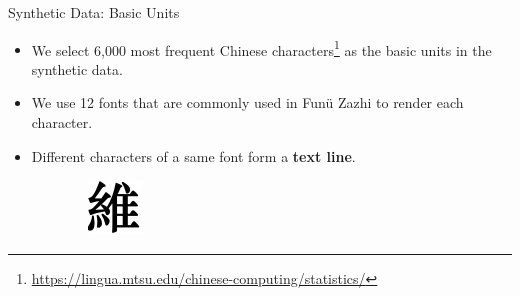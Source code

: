 \documentclass{beamer}
\begin{document}
\begin{frame}
    \begin{center}
        \Large{Synthetic Data: Basic Units}
    \end{center}
    \begin{itemize}
        \item We select 6,000 most frequent Chinese characters\footnote{\url{https://lingua.mtsu.edu/chinese-computing/statistics/}} as the basic units in the synthetic data.
        \item We use 12 fonts that are commonly used in Funü Zazhi to render each character.
        \item Different characters of a same font form a \textbf{text line}.
    \end{itemize}
    \begin{figure}[htbp]
        \centering
        \begin{subfigure}[b]{0.1\linewidth}
            \includegraphics[width=\linewidth]{./figures/fonts/642_0.jpg}
            \label{fig:fonts1}
        \end{subfigure}
        \hfill
        \begin{subfigure}[b]{0.1\linewidth}

\end{subfigure}
\end{figure}
\end{frame}
\end{document}
